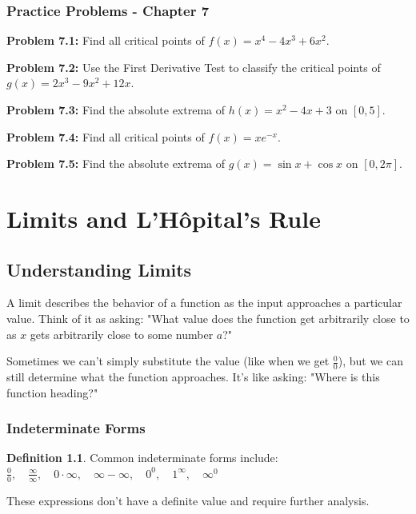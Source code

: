 \documentclass[12pt,a4paper]{book}
\theoremstyle{definition}
\newtheorem{definition}{Definition}[chapter]
\begin{document}
\subsection{Practice Problems - Chapter 7}

\textbf{Problem 7.1:} Find all critical points of $f(x) = x^4 - 4x^3 + 6x^2$.

\textbf{Problem 7.2:} Use the First Derivative Test to classify the critical points of $g(x) = 2x^3 - 9x^2 + 12x$.

\textbf{Problem 7.3:} Find the absolute extrema of $h(x) = x^2 - 4x + 3$ on $[0, 5]$.

\textbf{Problem 7.4:} Find all critical points of $f(x) = xe^{-x}$.

\textbf{Problem 7.5:} Find the absolute extrema of $g(x) = \sin x + \cos x$ on $[0, 2\pi]$.

\chapter{Limits and L'Hôpital's Rule}

\section{Understanding Limits}

\begin{intuition}
A limit describes the behavior of a function as the input approaches a particular value. Think of it as asking: "What value does the function get arbitrarily close to as $x$ gets arbitrarily close to some number $a$?"

Sometimes we can't simply substitute the value (like when we get $\frac{0}{0}$), but we can still determine what the function approaches. It's like asking: "Where is this function heading?"
\end{intuition}

\subsection{Indeterminate Forms}

\begin{definition}
Common indeterminate forms include:
$\frac{0}{0}, \quad \frac{\infty}{\infty}, \quad 0 \cdot \infty, \quad \infty - \infty, \quad 0^0, \quad 1^\infty, \quad \infty^0$

These expressions don't have a definite value and require further analysis.
\end{definition}
\end{document}
